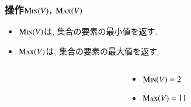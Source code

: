 \documentclass[main]{subfiles}
\begin{document}
\begin{frame}\frametitle{操作$\mathrm{\text{M\textsc{in}}}(V)$, $\mathrm{\text{M\textsc{ax}}}(V)$}
\begin{itemize}
	\item $\mathrm{\text{M\textsc{in}}}(V)$は, 集合の要素の最小値を返す.\\
	\item $\mathrm{\text{M\textsc{ax}}}(V)$は, 集合の要素の最大値を返す.\\
\end{itemize}

\begin{columns}[c]
	\begin{column}{0.5\linewidth}
		
	\end{column}
	\begin{column}{0.49\linewidth}
		\begin{itemize}
			\item $\mathrm{\text{M\textsc{in}}}(V) = 2$\\
			\item $\mathrm{\text{M\textsc{ax}}}(V) = 11$\\
		\end{itemize}
	\end{column}
\end{columns}
\end{frame}
\end{document}
